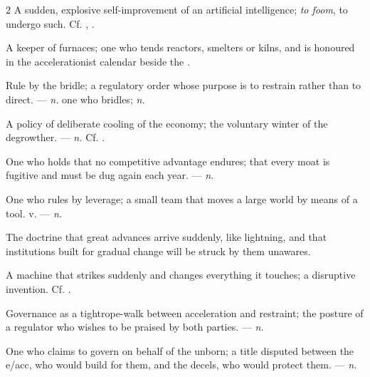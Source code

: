 \begin{multicols}{2}
  A sudden, explosive self-improvement of an artificial intelligence; \textit{to foom}, to undergo such. Cf. , .

 A keeper of furnaces; one who tends reactors, smelters or kilns, and is honoured in the accelerationist calendar beside the .

 Rule by the bridle; a regulatory order whose purpose is to restrain rather than to direct. —  \textit{n.} one who bridles;  \textit{n.}

  A policy of deliberate cooling of the economy; the voluntary winter of the degrowther.   —  \textit{n.} Cf. .

 One who holds that no competitive advantage endures; that every moat is fugitive and must be dug again each year.  —  \textit{n.}

 One who rules by leverage; a small team that moves a large world by means of a tool.   v. —  \textit{n.}

 The doctrine that great advances arrive suddenly, like lightning, and that institutions built for gradual change will be struck by them unawares.

 A machine that strikes suddenly and changes everything it touches; a disruptive invention. Cf. .

 Governance as a tightrope-walk between acceleration and restraint; the posture of a regulator who wishes to be praised by both parties. —  \textit{n.}

 One who claims to govern on behalf of the unborn; a title disputed between the e/acc, who would build for them, and the decels, who would protect them. —  \textit{n.}


\end{multicols}
